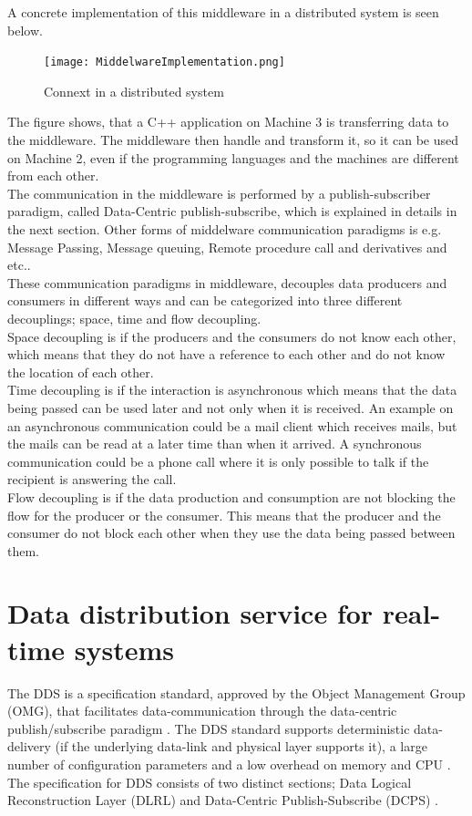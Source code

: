 \documentclass[Main]{subfiles}
\begin{document}
A concrete implementation of this middleware in a distributed system is seen below.
\begin{figure}[H]
\centering
\texttt{[image: MiddelwareImplementation.png]}
\caption{Connext in a distributed system}
\end{figure}

The figure shows, that a C++ application on Machine 3 is transferring data to the middleware. The middleware then handle and transform it, so it can be used on Machine 2, even if the programming languages and the machines are different from each other. 
\\
The communication in the middleware is performed by a publish-subscriber paradigm, called Data-Centric publish-subscribe, which is explained in details in the next section. Other forms of middelware communication paradigms is e.g. Message Passing, Message queuing, Remote procedure call and derivatives and etc.\cite{DDS-slides}.\\
These communication paradigms in middleware, decouples data producers and consumers in different ways and can be categorized into three different decouplings; space, time and flow decoupling.\\
Space decoupling is if the producers and the consumers do not know each other, which means that they do not have a reference to each other and do not know the location of each other.
\\
Time decoupling is if the interaction is asynchronous which means that the data being passed can be used later and not only when it is received. An example on an asynchronous communication could be a mail client which receives mails, but the mails can be read at a later time than when it arrived. A synchronous communication could be a phone call where it is only possible to talk if the recipient is answering the call. \\
Flow decoupling is if the data production and consumption are not blocking the flow for the producer or the consumer. This means that the producer and the consumer do not block each other when they use the data being passed between them.\\

\section{Data distribution service for real-time systems}
The DDS is a specification standard, approved by the Object Management Group (OMG), that facilitates data-communication through the data-centric publish/subscribe paradigm \cite{RTI}. The DDS standard supports deterministic data-delivery (if the underlying data-link and physical layer supports it), a large number of configuration parameters and a low overhead on memory and CPU \cite{DDS-slides}.\\
The specification for DDS consists of two distinct sections; Data Logical Reconstruction Layer (DLRL) and Data-Centric Publish-Subscribe (DCPS) \cite{DDS-slides}.
\end{document}
